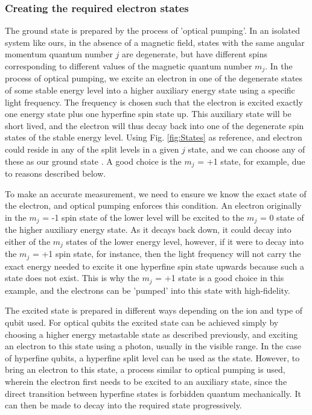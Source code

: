 \subsubsection{Creating the required electron states}
The ground state \kz is prepared by the process of 'optical pumping'. In an isolated system like ours, in the absence of a magnetic field, states with the same angular momentum quantum number $j$ are degenerate, but have different spins corresponding to different values of the magnetic quantum number $m_j$. In the process of optical pumping, we excite an electron in one of the degenerate states of some stable energy level into a higher auxiliary energy state using a specific light frequency. The frequency is chosen such that the electron is excited exactly one energy state plus one hyperfine spin state up. This auxiliary state will be short lived, and the electron will thus decay back into one of the degenerate spin states of the stable energy level. Using Fig. \ref{fig:States} as reference, and electron could reside in any of the split levels in a given $j$ state, and we can choose any of these as our ground state \kz. A good choice is the $m_j$ = +1 state, for example, due to reasons described below. 

To make an accurate measurement, we need to ensure we know the exact state of the electron, and optical pumping enforces this condition. An electron originally in the $m_j$ = -1 spin state of the lower level will be excited to the $m_j$ = 0 state of the higher auxiliary energy state. As it decays back down, it could decay into either of the $m_j$ states of the lower energy level, however, if it were to decay into the $m_j$ = +1 spin state, for instance, then the light frequency will not carry the exact energy needed to excite it one hyperfine spin state upwards because such a state does not exist. This is why the $m_j$ = +1 state is a good choice in this example, and the electrons can be 'pumped' into this state with high-fidelity. 

The excited state \ko is prepared in different ways depending on the ion and type of qubit used. For optical qubits the excited state can be achieved simply by choosing a higher energy metastable state as described previously, and exciting an electron to this state using a photon, usually in the visible range. In the case of hyperfine qubits, a hyperfine split level can be used as the \ko state. However, to bring an electron to this state, a process similar to optical pumping is used, wherein the electron first needs to be excited to an auxiliary state, since the direct transition between hyperfine states is forbidden quantum mechanically. It can then be made to decay into the required \ko state progressively.


